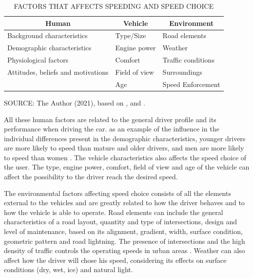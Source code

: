 \begin{table}[!hbtp]
    \footnotesize
    \captionsetup{justification=raggedright,
        singlelinecheck=false,
        font=footnotesize}
    \caption{FACTORS THAT AFFECTS SPEEDING AND SPEED CHOICE}
    \centering
    \begin{tabular}{lll}
    \hline
    \multicolumn{1}{c}{\textbf{Human}}                  & \multicolumn{1}{c}{\textbf{Vehicle}} & \multicolumn{1}{c}{\textbf{Environment}} \\ \hline
    Background characteristics      & Type/Size        & Road elements        \\
    Demographic characteristics     & Engine power     & Weather              \\
    Physiological factors           & Comfort          & Traffic conditions   \\
    Attitudes, beliefs and motivations & Field of view    & Surroundings    \\
                                    & Age              & Speed Enforcement    \\ \hline
\end{tabular}
    \label{tab:spdfct}
    \par \vspace{2mm} \footnotesize \raggedright
    SOURCE: The Author (2021), based on \textcite{Richard2013a}, \textcite{Shinar2017} and \textcite{WHO2008}.
\end{table}

All these human factors are related to the general driver profile and its performance when driving the car. as an example of the influence in the individual differences present in the demographic characteristics, younger drivers are more likely to speed than mature and older drivers, and men are more likely to speed than women \cite{Shinar2017}. The vehicle characteristics also affects the speed choice of the user. The type, engine power, comfort, field of view and age of the vehicle can affect the possibility to the driver reach the desired speed. 

The environmental factors affecting speed choice consists of all the elements external to the vehicles and are greatly related to how the driver behaves and to how the vehicle is able to operate. Road elements can include the general characteristics of a road layout, quantity and type of intersections, design and level of maintenance, based on its alignment, gradient, width, surface condition, geometric pattern and road lightning. The presence of intersections and the high density of traffic controls the operating speeds in urban areas \cite{Mohan2016a}. Weather can also affect how the driver will chose his speed, considering its effects on surface conditions (dry, wet, ice) and natural light.  

